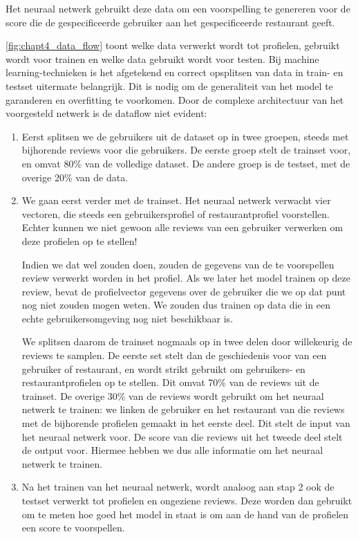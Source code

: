Het neuraal netwerk gebruikt deze data om een voorspelling te genereren voor de score die de gespecificeerde gebruiker aan het gespecificeerde restaurant geeft.

\autoref{fig:chapt4_data_flow} toont welke data verwerkt wordt tot profielen, gebruikt wordt voor trainen en welke data gebruikt wordt voor testen. Bij machine learning-technieken is het afgetekend en correct opsplitsen van data in train- en testset uitermate belangrijk. Dit is nodig om de generaliteit van het model te garanderen en overfitting te voorkomen. Door de complexe architectuur van het voorgesteld netwerk is de dataflow niet evident:

\begin{enumerate}
    \item Eerst splitsen we de gebruikers uit de dataset op in twee groepen, steeds met bijhorende reviews voor die gebruikers. De eerste groep stelt de trainset voor, en omvat 80\% van de volledige dataset. De andere groep is de testset, met de overige 20\% van de data.
    \item We gaan eerst verder met de trainset. Het neuraal netwerk verwacht vier vectoren, die steeds een gebruikersprofiel of restaurantprofiel voorstellen. Echter kunnen we niet gewoon alle reviews van een gebruiker verwerken om deze profielen op te stellen! 
    
    Indien we dat wel zouden doen, zouden de gegevens van de te voorspellen review verwerkt worden in het profiel. Als we later het model trainen op deze review, bevat de profielvector gegevens over de gebruiker die we op dat punt nog niet zouden mogen weten. We zouden dus trainen op data die in een echte gebruikersomgeving nog niet beschikbaar is.

    We splitsen daarom de trainset nogmaals op in twee delen door willekeurig de reviews te samplen. De eerste set stelt dan de geschiedenis voor van een gebruiker of restaurant, en wordt strikt gebruikt om gebruikers- en restaurantprofielen op te stellen. Dit omvat 70\% van de reviews uit de trainset.\newline
    De overige 30\% van de reviews wordt gebruikt om het neuraal netwerk te trainen: we linken de gebruiker en het restaurant van die reviews met de bijhorende profielen gemaakt in het eerste deel. Dit stelt de input van het neuraal netwerk voor. De score van die reviews uit het tweede deel stelt de output voor. Hiermee hebben we dus alle informatie om het neuraal netwerk te trainen. 

    \item Na het trainen van het neuraal netwerk, wordt analoog aan stap 2 ook de testset verwerkt tot profielen en ongeziene reviews. Deze worden dan gebruikt om te meten hoe goed het model in staat is om aan de hand van de profielen een score te voorspellen.


\end{enumerate}
